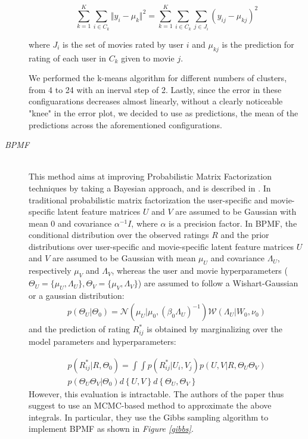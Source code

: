 \documentclass[10pt,conference,compsocconf]{IEEEtran}
\begin{document}
\begin{description}
$$
\sum_{k=1}^K \sum_{i \in C_k} \Vert y_i - \mu_k \Vert^2 = \sum_{k=1}^K \sum_{i \in C_k} \sum_{j \in J_i} (y_{ij} - \mu_{kj})^2
$$

\noindent where $J_i$ is the set of movies rated by user $i$ and $\mu_{kj}$ is the prediction for rating of each user in $C_k$ given to movie $j$.

We performed the k-means algorithm for different numbers of clusters, from 4 to 24 with an inerval step of 2. Lastly, since the error in these configuarations decreases almost linearly, without a clearly noticeable "knee" in the error plot, we decided to use as predictions, the mean of the predictions across the aforementioned configurations.

\item[\emph{BPMF}] \ \\
This method aims at improving Probabilistic Matrix Factorization techniques by taking a Bayesian approach, and is described in \cite{BPMF}. In traditional probabilistic matrix factorization the user-specific and movie-specific latent feature matrices $U$ and $V$ are assumed to be Gaussian with mean 0 and covariance $\alpha^{-1} I$, where $\alpha$ is a precision factor.  
In BPMF, the conditional distribution over the observed ratings $R$ and the prior distributions over user-specific and movie-specific latent feature matrices $U$ and $V$ are assumed to be Gaussian with mean $\mu_{U}$ and covariance $\Lambda_{U}$, respectively $\mu_{V}$ and $\Lambda_{V}$, whereas the user and movie hyperparameters ($\Theta_{U}=\{\mu_{U},\Lambda_{U}\}, \Theta_{V}=\{\mu_{V},\Lambda_{V}\}$) are assumed to follow a Wishart-Gaussian or a gaussian distribution:
$$
\begin{aligned}
p(\Theta_{U} \vert \Theta_{0}) =  \mathcal{N}(\mu_{U} \vert \mu_{0}, (\beta_{0}\Lambda_{U})^{-1})\mathcal{W}(\Lambda_{U} \vert W_{0}, \nu_{0})
\end{aligned}
$$
and the prediction of rating $R_{ij}^*$ is obtained by marginalizing over the model parameters and hyperparameters:

$$
\begin{aligned}
p(R_{ij}^* \vert R, \Theta_0) =  \int\int p(R_{ij}^* \vert U_i,V_j)p(U,V \vert R, \Theta_U \Theta_V) \\
p(\Theta_U \Theta_V \vert \Theta_0)d \left\lbrace U,V \right\rbrace  d \left\lbrace \Theta_U, \Theta_V \right\rbrace
\end{aligned}
$$
\noindent However, this evaluation is intractable. The authors of the paper thus suggest to use an MCMC-based method to approximate the above integrals. In particular, they use the Gibbs sampling algorithm to implement BPMF as shown in \emph{Figure \ref{gibbs}}.


\end{description}
\end{document}
